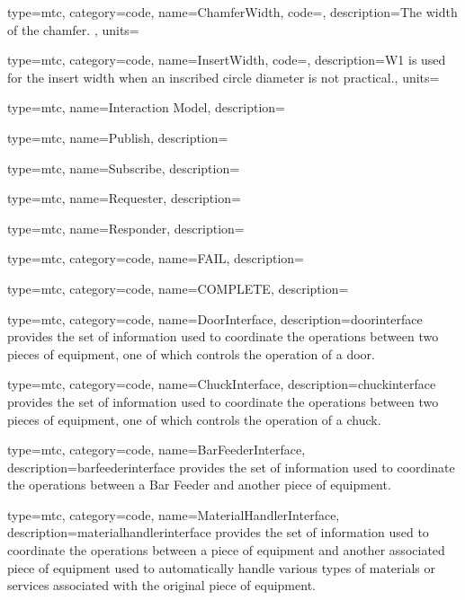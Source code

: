 {
  type=mtc,
  category=code,
  name={ChamferWidth},
  code=,
  description={The width of the chamfer. },
  units=
}

{
  type=mtc,
  category=code,
  name={InsertWidth},
  code=,
  description={W1 is used for the insert width when an inscribed circle diameter is not practical.},
  units=
}



{
  type=mtc,
  name={Interaction Model},
  description={}
}


{
  type=mtc,
  name={Publish},
  description={}
}

{
  type=mtc,
  name={Subscribe},
  description={}
}


{
  type=mtc,
  name={Requester},
  description={}
}

{
  type=mtc,
  name={Responder},
  description={}
}


{
  type=mtc,
  category=code,
  name={FAIL},
  description={}
}

{
  type=mtc,
  category=code,
  name={COMPLETE},
  description={}
}

{
  type=mtc,
  category=code,
  name={DoorInterface},
  description={\gls{doorinterface} provides the set of information used to coordinate the operations between two pieces of equipment, one of which controls the operation of a door. }
}


{
  type=mtc,
  category=code,
  name={ChuckInterface},
  description={\gls{chuckinterface} provides the set of information used to coordinate the operations between two pieces of equipment, one of which controls the operation of a chuck.  }
}

{
  type=mtc,
  category=code,
  name={BarFeederInterface},
  description={\gls{barfeederinterface} provides the set of information used to coordinate the operations between a Bar Feeder and another piece of equipment.  }
}

{
  type=mtc,
  category=code,
  name={MaterialHandlerInterface},
  description={\gls{materialhandlerinterface} provides the set of information used to coordinate the operations between a piece of equipment and another associated piece of equipment used to automatically handle various types of materials or services associated with the original piece of equipment. }
}

